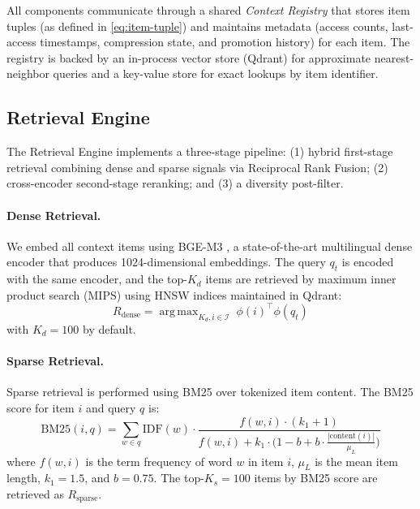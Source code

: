\documentclass[review,12pt]{elsarticle}
\DeclareMathOperator*{\argmax}{arg\,max}
\begin{document}
All components communicate through a shared \emph{Context Registry} that stores
item tuples (as defined in \cref{eq:item-tuple}) and maintains metadata
(access counts, last-access timestamps, compression state, and promotion
history) for each item.  The registry is backed by an in-process vector store
(Qdrant) for approximate nearest-neighbor queries and a key-value store for
exact lookups by item identifier.

\subsection{Retrieval Engine}
\label{subsec:retrieval-engine}

The Retrieval Engine implements a three-stage pipeline: (1) hybrid first-stage
retrieval combining dense and sparse signals via Reciprocal Rank Fusion; (2)
cross-encoder second-stage reranking; and (3) a diversity post-filter.

\paragraph{Dense Retrieval.}
We embed all context items using BGE-M3 \citep{chen2024bgem3}, a
state-of-the-art multilingual dense encoder that produces 1024-dimensional
embeddings.  The query $q_t$ is encoded with the same encoder, and the top-$K_d$
items are retrieved by maximum inner product search (MIPS) using HNSW indices
maintained in Qdrant:
\begin{equation}
  R_{\text{dense}} = \argmax_{K_d, i \in \mathcal{I}}
  \; \phi(i)^\top \phi(q_t)
  \label{eq:dense-retrieval}
\end{equation}
with $K_d = 100$ by default.

\paragraph{Sparse Retrieval.}
Sparse retrieval is performed using BM25 \citep{robertson2009bm25} over
tokenized item content.  The BM25 score for item $i$ and query $q$ is:
\begin{equation}
  \text{BM25}(i, q) = \sum_{w \in q} \text{IDF}(w)
  \cdot \frac{f(w, i) \cdot (k_1 + 1)}{f(w, i) + k_1 \cdot
    \bigl(1 - b + b \cdot \frac{|\text{content}(i)|}{\mu_L}\bigr)}
  \label{eq:bm25}
\end{equation}
where $f(w, i)$ is the term frequency of word $w$ in item $i$,
$\mu_L$ is the mean item length, $k_1 = 1.5$, and $b = 0.75$.
The top-$K_s = 100$ items by BM25 score are retrieved as $R_{\text{sparse}}$.
\end{document}
